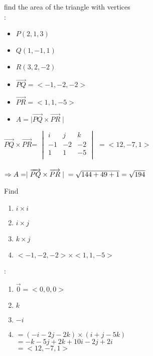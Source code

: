 \noindent{\color{smalt(darkpowderblue)}\rule{\linewidth}{.2mm}}
\begin{example}
find the area of the triangle with vertices\\
{} :
\begin{itemize}
\item $P(2,1,3)$
\item $Q(1,-1,1)$
\item $R(3,2,-2)$
\item ${\overrightarrow{PQ}} = < -1,-2,-2 > $
\item  ${\overrightarrow{PR}} = < 1,1,-5 >$
\item $A = \mid{\overrightarrow{PQ}}\times{\overrightarrow{PR}}\mid$
\end{itemize}
${\overrightarrow{PQ}}\times{\overrightarrow{PR}}$=
$\begin{vmatrix}
{i} & {j} & {k} \\
{-1} & {-2} & {-2} \\
{1} &{1} & {-5} \\
\end{vmatrix}$
$= <12,-7,1>$\\ \\
$\Rightarrow A =   \mid{\overrightarrow{PQ}}\times{\overrightarrow{PR}}\mid \\ 
=  \sqrt{144+49+1} \\
= \sqrt{194}$ \\
\end{example}
\noindent{\color{smalt(darkpowderblue)}\rule{\linewidth}{.2mm}}
\begin{example}
Find 
\begin{enumerate}
\item $i \times i$
\item $i \times j $
\item $k \times j$
\item $<-1,-2,-2> \times <1,1,-5> $
\end{enumerate}
{} :
\begin{enumerate}
\item $ {\overrightarrow{0}} = <0,0,0>$
\item $ k$
\item $-i$
\item $= (-i -2j -2k) \times (i + j -5k)$\\
$ = -k -5j +2k +10i -2j +2i $\\
$= <12,-7,1>$
\end{enumerate}
\end{example}

